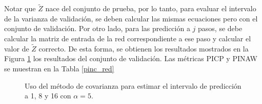 \documentclass[12pt]{article}
\begin{document}
Notar que $\tilde{Z}$ nace del conjunto de prueba, por lo tanto, para evaluar el intervalo de la varianza de validación, se deben calcular las mismas ecuaciones pero con el conjunto de validación. Por otro lado, para las predicción a $j$ pasos, se debe calcular la matriz de entrada de la red correspondiente a ese paso y calcular el valor de $\tilde{Z}$ correcto. De esta forma, se obtienen los resultados mostrados en la Figura \ref{cov_val} los resultados del conjunto de validación. Las métricas PICP y PINAW se muestran en la Tabla \ref{pinc_red} 

\begin{figure}[h!]
	\centering
	\captionsetup{justification=centering}
	 \newline
	\caption{Uso del método de covarianza para estimar el intervalo de predicción a 1, 8 y 16 con $\alpha=5$.}
	\label{cov_val}
\end{figure}
\end{document}

